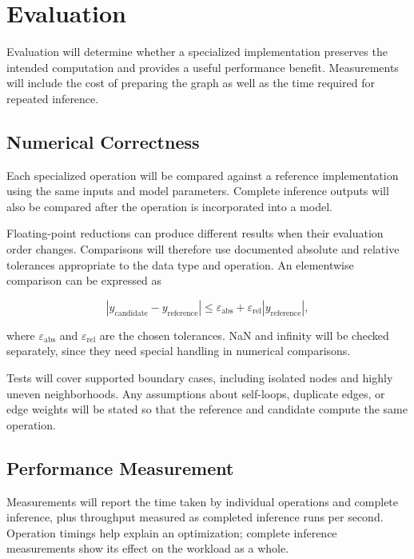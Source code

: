 \section{Evaluation}
\label{sec:evaluation}

Evaluation will determine whether a specialized implementation preserves the intended computation and provides a useful performance benefit. Measurements will include the cost of preparing the graph as well as the time required for repeated inference.

\subsection{Numerical Correctness}

Each specialized operation will be compared against a reference implementation using the same inputs and model parameters. Complete inference outputs will also be compared after the operation is incorporated into a model.

Floating-point reductions can produce different results when their evaluation order changes. Comparisons will therefore use documented absolute and relative tolerances appropriate to the data type and operation. An elementwise comparison can be expressed as

\[
  |y_{\mathrm{candidate}}-y_{\mathrm{reference}}|
  \leq \varepsilon_{\mathrm{abs}}
  + \varepsilon_{\mathrm{rel}}|y_{\mathrm{reference}}|,
\]

where $\varepsilon_{\mathrm{abs}}$ and $\varepsilon_{\mathrm{rel}}$ are the chosen tolerances. NaN and infinity will be checked separately, since they need special handling in numerical comparisons.

Tests will cover supported boundary cases, including isolated nodes and highly uneven neighborhoods. Any assumptions about self-loops, duplicate edges, or edge weights will be stated so that the reference and candidate compute the same operation.

\subsection{Performance Measurement}

Measurements will report the time taken by individual operations and complete inference, plus throughput measured as completed inference runs per second. Operation timings help explain an optimization; complete inference measurements show its effect on the workload as a whole.

